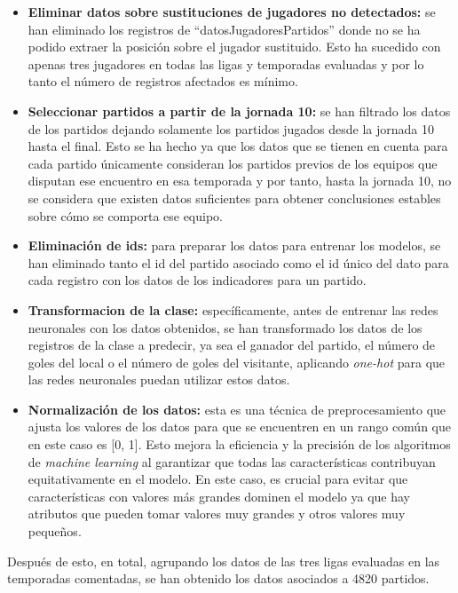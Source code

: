 \begin{itemize}
    \item \textbf{Eliminar datos sobre sustituciones de jugadores no detectados:} se han eliminado los registros de ``datosJugadoresPartidos'' donde no se ha podido extraer la posición sobre el jugador sustituido. Esto ha sucedido con apenas tres jugadores en todas las ligas y temporadas evaluadas y por lo tanto el número de registros afectados es mínimo.
    \item \textbf{Seleccionar partidos a partir de la jornada 10:} se han filtrado los datos de los partidos dejando solamente los partidos jugados desde la jornada 10 hasta el final. Esto se ha hecho ya que los datos que se tienen en cuenta para cada partido únicamente consideran los partidos previos de los equipos que disputan ese encuentro en esa temporada y por tanto, hasta la jornada 10, no se considera que existen datos suficientes para obtener conclusiones estables sobre cómo se comporta ese equipo.
    \item \textbf{Eliminación de ids:} para preparar los datos para entrenar los modelos, se han eliminado tanto el id del partido asociado como el id único del dato para cada registro con los datos de los indicadores para un partido.
    \item \textbf{Transformacion de la clase:} específicamente, antes de entrenar las redes neuronales con los datos obtenidos, se han transformado los datos de los registros de la clase a predecir, ya sea el ganador del partido, el número de goles del local o el número de goles del visitante, aplicando \textit{one-hot} para que las redes neuronales puedan utilizar estos datos.
    \item \textbf{Normalización de los datos:} esta es una técnica de preprocesamiento que ajusta los valores de los datos para que se encuentren en un rango común que en este caso es [0, 1]. Esto mejora la eficiencia y la precisión de los algoritmos de \textit{machine learning} al garantizar que todas las características contribuyan equitativamente en el modelo. En este caso, es crucial para evitar que características con valores más grandes dominen el modelo ya que hay atributos que pueden tomar valores muy grandes y otros valores muy pequeños.

\end{itemize}

Después de esto, en total, agrupando los datos de las tres ligas evaluadas en las temporadas
comentadas, se han obtenido los datos asociados a 4820 partidos.


